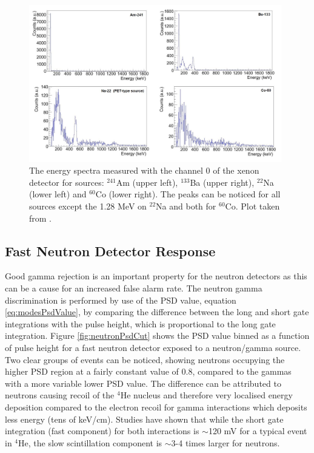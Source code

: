 \begin{figure}[htbp]
\begin{center}
\includegraphics[width=110mm]{Chapter8/figures/XenonSourceIdentification.pdf}
\caption{The energy spectra measured with the channel 0 of the xenon detector for sources: $^{241}$Am (upper left), $^{133}$Ba (upper right), $^{22}$Na (lower left) and $^{60}$Co (lower right). The peaks can be noticed for all sources except the 1.28 MeV on $^{22}$Na and both for $^{60}$Co. Plot taken from \cite{modesInternal}.}
\label{fig:modesXenonSourceTests}
\end{center}
\end{figure}

\subsection{Fast Neutron Detector Response}
Good gamma rejection is an important property for the neutron detectors as this can be a cause for an increased false alarm rate. The neutron gamma discrimination is performed by use of the PSD value, equation \ref{eq:modesPsdValue}, by comparing the difference between the long and short gate integrations with the pulse height, which is proportional to the long gate integration. Figure \ref{fig:neutronPsdCut} shows the PSD value binned as a function of pulse height for a fast neutron detector exposed to a neutron/gamma source. Two clear groups of events can be noticed, showing neutrons occupying the higher PSD region at a fairly constant value of 0.8, compared to the gammas with a more variable lower PSD value. The difference can be attributed to neutrons causing recoil of the $^{4}$He nucleus and therefore very localised energy deposition compared to the electron recoil for gamma interactions which deposits less energy (tens of keV/cm). Studies have shown \cite{helium4Detectors} that while the short gate integration (fast component) for both interactions is $\sim$120 mV for a typical event in $^{4}$He, the slow scintillation component is $\sim$3-4 times larger for neutrons.


